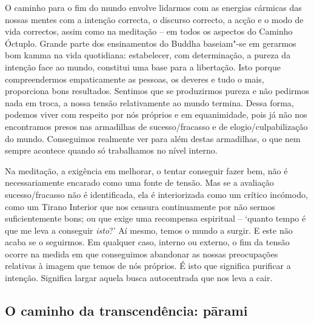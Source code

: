 O caminho para o fim do mundo envolve lidarmos com as energias cármicas das
nossas mentes com a intenção correcta, o discurso correcto, a acção e o modo de
vida correctos, assim como na meditação -- em todos os aspectos do Caminho
Óctuplo. Grande parte dos ensinamentos do Buddha baseiam"-se em gerarmos bom
kamma na vida quotidiana: estabelecer, com determinação, a pureza da intenção
face ao mundo, constitui uma base para a libertação. Isto porque compreendermos
empaticamente as pessoas, os deveres e tudo o mais, proporciona bons resultados.
Sentimos que se produzirmos pureza e não pedirmos nada em troca, a nossa tensão
relativamente ao mundo termina. Dessa forma, podemos viver com respeito por nós
próprios e em equanimidade, pois já não nos encontramos presos nas armadilhas de
sucesso/fracasso e de elogio/culpabilização do mundo. Conseguimos realmente ver
para além destas armadilhas, o que nem sempre acontece quando só trabalhamos no
nível interno.

Na meditação, a exigência em melhorar, o tentar conseguir fazer bem, não é
necessariamente encarado como uma fonte de tensão. Mas se a avaliação
sucesso/fracasso não é identificada, ela é interiorizada como um crítico
incómodo, como um Tirano Interior que nos censura continuamente por não sermos
suficientemente bons; ou que exige uma recompensa espiritual -- `quanto tempo é
que me leva a conseguir \emph{isto}?' Aí mesmo, temos o mundo a surgir. E este
não acaba se o seguirmos. Em qualquer caso, interno ou externo, o fim da tensão
ocorre na medida em que conseguimos abandonar as nossas preocupações relativas à
imagem que temos de nós próprios. É isto que significa purificar a intenção.
Significa largar aquela busca autocentrada que nos leva a cair.

\subsection{O caminho da transcendência: pārami}

